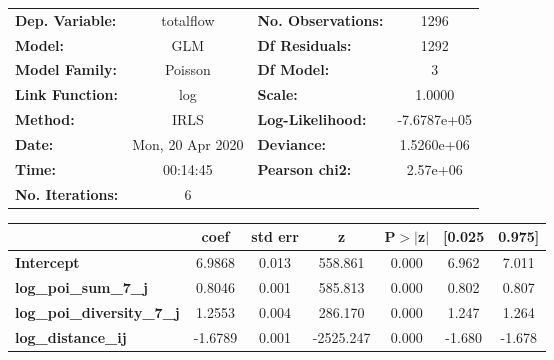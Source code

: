 \begin{center}
\begin{tabular}{lclc}
\toprule
\textbf{Dep. Variable:}            &    totalflow     & \textbf{  No. Observations:  } &      1296    \\
\textbf{Model:}                    &       GLM        & \textbf{  Df Residuals:      } &      1292    \\
\textbf{Model Family:}             &     Poisson      & \textbf{  Df Model:          } &         3    \\
\textbf{Link Function:}            &       log        & \textbf{  Scale:             } &     1.0000   \\
\textbf{Method:}                   &       IRLS       & \textbf{  Log-Likelihood:    } & -7.6787e+05  \\
\textbf{Date:}                     & Mon, 20 Apr 2020 & \textbf{  Deviance:          } &  1.5260e+06  \\
\textbf{Time:}                     &     00:14:45     & \textbf{  Pearson chi2:      } &   2.57e+06   \\
\textbf{No. Iterations:}           &        6         & \textbf{                     } &              \\
\bottomrule
\end{tabular}
\begin{tabular}{lcccccc}
                                   & \textbf{coef} & \textbf{std err} & \textbf{z} & \textbf{P$> |$z$|$} & \textbf{[0.025} & \textbf{0.975]}  \\
\midrule
\textbf{Intercept}                 &       6.9868  &        0.013     &   558.861  &         0.000        &        6.962    &        7.011     \\
\textbf{log\_poi\_sum\_7\_j}       &       0.8046  &        0.001     &   585.813  &         0.000        &        0.802    &        0.807     \\
\textbf{log\_poi\_diversity\_7\_j} &       1.2553  &        0.004     &   286.170  &         0.000        &        1.247    &        1.264     \\
\textbf{log\_distance\_ij}         &      -1.6789  &        0.001     & -2525.247  &         0.000        &       -1.680    &       -1.678     \\
\bottomrule
\end{tabular}
\end{center}